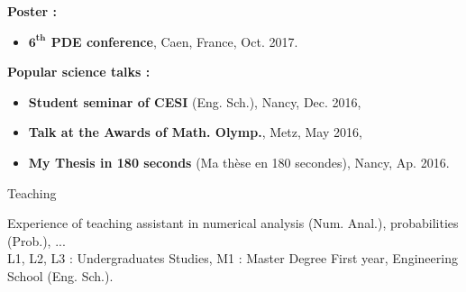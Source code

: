 \documentclass[10pt,a4paper]{report}
\begin{document}
\vspace{0.3cm}
\noindent
{\selectfont
\textbf{Poster :}
}

\begin{itemize}
\item \textbf{$\mathbf{6^{th}}$ PDE conference}, Caen, France, Oct. 2017.
\end{itemize}


\vspace{0.3cm}
\noindent
{\selectfont
\textbf{Popular science talks :}
}
\begin{itemize}
\item \textbf{Student seminar of CESI }(Eng. Sch.), Nancy, Dec. 2016,
\item \textbf{Talk at the Awards of Math. Olymp.}, Metz, May 2016,
\item \textbf{My Thesis in 180 seconds} (Ma thèse en 180 secondes), Nancy, Ap. 2016.
\end{itemize}

\vspace{.5cm}
\noindent
{\selectfont
\begin{Large}
Teaching
\end{Large}
\hrulefill
}
Experience of teaching assistant in numerical analysis (Num. Anal.), probabilities (Prob.), ...\\
L1, L2, L3 : Undergraduates Studies, M1 : Master Degree First year, Engineering School (Eng. Sch.).
\end{document}
